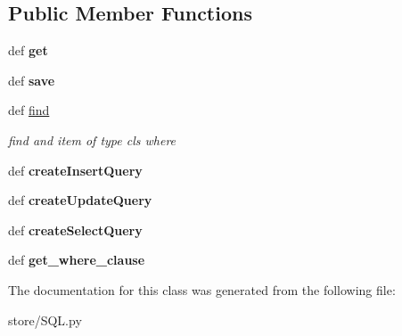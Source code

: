 \subsection*{Public Member Functions}
\begin{DoxyCompactItemize}
\item 
\hypertarget{classstore_1_1_s_q_l_1_1_s_q_l_store_a0d775053e59a81dbcb75d09165dd8cae}{def {\bfseries get}}\label{classstore_1_1_s_q_l_1_1_s_q_l_store_a0d775053e59a81dbcb75d09165dd8cae}

\item 
\hypertarget{classstore_1_1_s_q_l_1_1_s_q_l_store_a12b33367cf18e7eac386aee95418888e}{def {\bfseries save}}\label{classstore_1_1_s_q_l_1_1_s_q_l_store_a12b33367cf18e7eac386aee95418888e}

\item 
\hypertarget{classstore_1_1_s_q_l_1_1_s_q_l_store_a248d092572d619057017503b275d6cc8}{def \hyperlink{classstore_1_1_s_q_l_1_1_s_q_l_store_a248d092572d619057017503b275d6cc8}{find}}\label{classstore_1_1_s_q_l_1_1_s_q_l_store_a248d092572d619057017503b275d6cc8}

\begin{DoxyCompactList}\small\item\em find and item of type cls where \end{DoxyCompactList}\item 
\hypertarget{classstore_1_1_s_q_l_1_1_s_q_l_store_ad3ec142956ae911e1f65af0b5daa38a5}{def {\bfseries create\-Insert\-Query}}\label{classstore_1_1_s_q_l_1_1_s_q_l_store_ad3ec142956ae911e1f65af0b5daa38a5}

\item 
\hypertarget{classstore_1_1_s_q_l_1_1_s_q_l_store_a44d196b4a998d323110725eb26c64b58}{def {\bfseries create\-Update\-Query}}\label{classstore_1_1_s_q_l_1_1_s_q_l_store_a44d196b4a998d323110725eb26c64b58}

\item 
\hypertarget{classstore_1_1_s_q_l_1_1_s_q_l_store_a01f0b8498a120c30fc298d732fc42d81}{def {\bfseries create\-Select\-Query}}\label{classstore_1_1_s_q_l_1_1_s_q_l_store_a01f0b8498a120c30fc298d732fc42d81}

\item 
\hypertarget{classstore_1_1_s_q_l_1_1_s_q_l_store_ad45a88ca31c747f0e4ae60e7d3d57d3c}{def {\bfseries get\-\_\-where\-\_\-clause}}\label{classstore_1_1_s_q_l_1_1_s_q_l_store_ad45a88ca31c747f0e4ae60e7d3d57d3c}

\end{DoxyCompactItemize}


The documentation for this class was generated from the following file\-:\begin{DoxyCompactItemize}
\item 
store/S\-Q\-L.\-py\end{DoxyCompactItemize}
